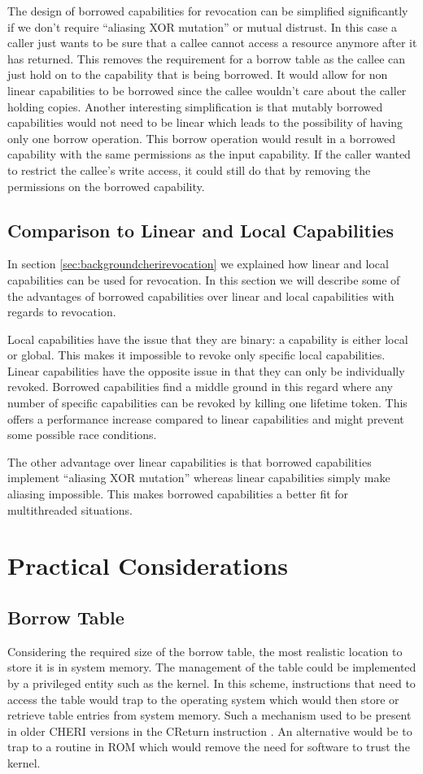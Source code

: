 The design of borrowed capabilities for revocation can be simplified significantly if we don't require ``aliasing XOR mutation'' or mutual distrust.
In this case a caller just wants to be sure that a callee cannot access a resource anymore after it has returned.
This removes the requirement for a borrow table as the callee can just hold on to the capability that is being borrowed.
It would allow for non linear capabilities to be borrowed since the callee wouldn't care about the caller holding copies.
Another interesting simplification is that mutably borrowed capabilities would not need to be linear which leads to the possibility of having only one borrow operation.
This borrow operation would result in a borrowed capability with the same permissions as the input capability.
If the caller wanted to restrict the callee's write access, it could still do that by removing the permissions on the borrowed capability.

\subsection{Comparison to Linear and Local Capabilities}
In section \ref{sec:backgroundcherirevocation} we explained how linear and local capabilities can be used for revocation.
In this section we will describe some of the advantages of borrowed capabilities over linear and local capabilities with regards to revocation.

Local capabilities have the issue that they are binary: a capability is either local or global.
This makes it impossible to revoke only specific local capabilities.
Linear capabilities have the opposite issue in that they can only be individually revoked.
Borrowed capabilities find a middle ground in this regard where any number of specific capabilities can be revoked by killing one lifetime token.
This offers a performance increase compared to linear capabilities and might prevent some possible race conditions.

The other advantage over linear capabilities is that borrowed capabilities implement ``aliasing XOR mutation'' whereas linear capabilities simply make aliasing impossible.
This makes borrowed capabilities a better fit for multithreaded situations.

\section{Practical Considerations}
\subsection{Borrow Table}
\label{sec:microarchbt}
Considering the required size of the borrow table, the most realistic location to store it is in system memory. The management of the table could be implemented by a privileged entity such as the kernel. In this scheme, instructions that need to access the table would trap to the operating system which would then store or retrieve table entries from system memory.
Such a mechanism used to be present in older CHERI versions in the CReturn instruction \cite{7723791}.
An alternative would be to trap to a routine in ROM which would remove the need for software to trust the kernel.

